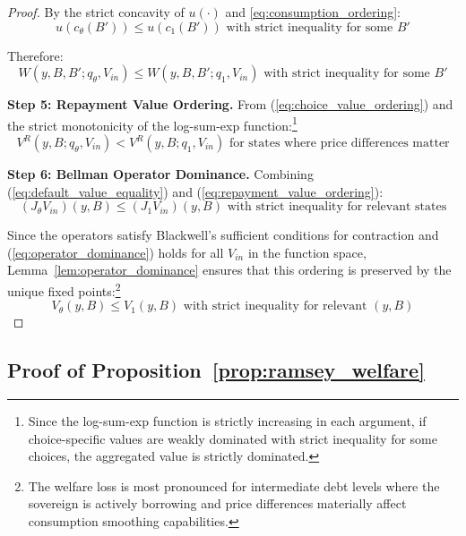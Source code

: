 \documentclass[12pt]{article}
\theoremstyle{plain}
\begin{document}
\begin{proof}
	By the strict concavity of $u(\cdot)$ and \eqref{eq:consumption_ordering}:
	\begin{equation}
		u(c_\theta(B')) \leq u(c_1(B')) \text{ with strict inequality for some } B' \label{eq:utility_ordering}
	\end{equation}

	Therefore:
	\begin{equation}
		W(y, B, B'; q_\theta, V_{in}) \leq W(y, B, B'; q_1, V_{in}) \text{ with strict inequality for some } B' \label{eq:choice_value_ordering}
	\end{equation}

	\textbf{Step 5: Repayment Value Ordering.} From (\ref{eq:choice_value_ordering}) and the strict monotonicity of the log-sum-exp function:\footnote{Since the log-sum-exp function is strictly increasing in each argument, if choice-specific values are weakly dominated with strict inequality for some choices, the aggregated value is strictly dominated.}
	\begin{equation}
		V^R(y, B; q_\theta, V_{in}) < V^R(y, B; q_1, V_{in}) \text{ for states where price differences matter} \label{eq:repayment_value_ordering}
	\end{equation}

	\textbf{Step 6: Bellman Operator Dominance.} Combining (\ref{eq:default_value_equality}) and (\ref{eq:repayment_value_ordering}):
	\begin{equation}
		(J_\theta V_{in})(y, B) \leq (J_1 V_{in})(y, B) \text{ with strict inequality for relevant states} \label{eq:operator_dominance}
	\end{equation}

	Since the operators satisfy Blackwell's sufficient conditions for contraction
	and (\ref{eq:operator_dominance}) holds for all $V_{in}$ in the function space,
	Lemma~\ref{lem:operator_dominance} ensures that this ordering is preserved by
	the unique fixed points:\footnote{The welfare loss is most pronounced for
		intermediate debt levels where the sovereign is actively borrowing and price
		differences materially affect consumption smoothing capabilities.}
	\begin{equation}
		V_\theta(y, B) \leq V_1(y, B) \text{ with strict inequality for relevant } (y,B) \label{eq:welfare_conclusion}
	\end{equation}

\end{proof}

\subsection{Proof of Proposition~\ref{prop:ramsey_welfare}}\label{app:proof_ramsey}
\end{document}
